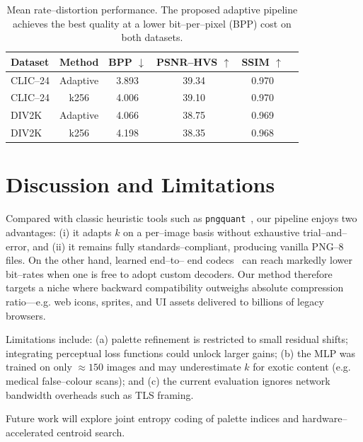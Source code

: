 \documentclass{../manuscript/Electrical new template/elektr}
\begin{document}
\begin{table}[!ht]
    \centering
    \caption{Mean rate--distortion performance.  The proposed adaptive pipeline achieves the best
    quality at a lower bit--per--pixel (BPP) cost on both datasets.}
    \label{tab:summary}
    \begin{tabular}{lccccc}
        \hline
        Dataset & Method & BPP $\downarrow$ & PSNR--HVS $\uparrow$ & SSIM $\uparrow$ \\
        \hline
        CLIC--24 & Adaptive & 3.893 & 39.34 & 0.970 \\
        CLIC--24 & k256     & 4.006 & 39.10 & 0.970 \\
        DIV2K    & Adaptive & 4.066 & 38.75 & 0.969 \\
        DIV2K    & k256     & 4.198 & 38.35 & 0.968 \\
        \hline
    \end{tabular}
\end{table}

\section{Discussion and Limitations}
Compared with classic heuristic tools such as \texttt{pngquant}~\cite{pngquant}, our pipeline enjoys two
advantages: (i) it adapts \(k\) on a per--image basis without exhaustive trial--and--error, and (ii) it
remains fully standards--compliant, producing vanilla PNG--8 files.  On the other hand, learned end--to--
end codecs~\cite{balle2017end,mentzer2018conditional} can reach markedly lower bit--rates when one is free
to adopt custom decoders.  Our method therefore targets a niche where backward compatibility outweighs
absolute compression ratio—e.g.
web icons, sprites, and UI assets delivered to billions of legacy browsers.

Limitations include: (a) palette refinement is restricted to small residual shifts; integrating
perceptual loss functions could unlock larger gains; (b) the MLP was trained on only \(\approx150\) images
and may underestimate \(k\) for exotic content (e.g.
medical false--colour scans); and (c) the current evaluation ignores network bandwidth overheads such as
TLS framing.

Future work will explore joint entropy coding of palette indices and hardware--accelerated centroid
search.

\FloatBarrier
\end{document}
